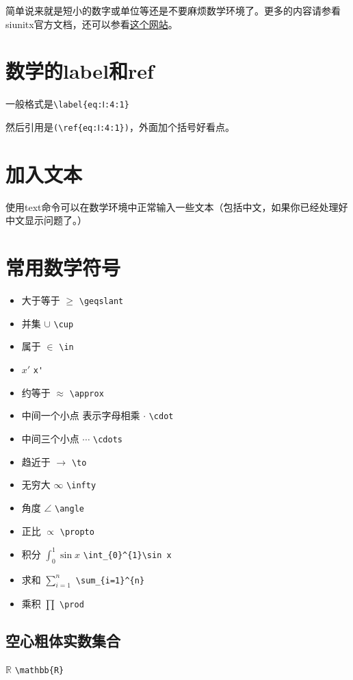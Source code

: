 \documentclass[11pt,oneside]{book}
\begin{document}
简单说来就是短小的数字或单位等还是不要麻烦数学环境了。更多的内容请参看siunitx官方文档，还可以参看\href{http://tex.stackexchange.com/questions/37168/when-to-use-math-mode}{这个网站}。



\section{数学的label和ref}
一般格式是\verb+\label{eq:Ⅰ:4:1}+

然后引用是\verb+(\ref{eq:Ⅰ:4:1})+，外面加个括号好看点。


\section{加入文本}
使用text命令可以在数学环境中正常输入一些文本（包括中文，如果你已经处理好中文显示问题了。）


\section{常用数学符号}
\begin{itemize}
\item  大于等于 $\geqslant$  \verb+\geqslant+
\item  并集 $\cup$  \verb+\cup+
\item 属于  $\in$  \verb+\in+
\item  $x'$  \verb+x'+
\item  约等于  $\approx$ \verb+\approx+
\item 中间一个小点 表示字母相乘 $\cdot$  \verb+\cdot+
\item 中间三个小点 $\cdots$  \verb+\cdots+
\item  趋近于  $\to$ \verb+\to+
\item 无穷大 $\infty$  \verb+\infty+
\item 角度 $\angle$ \verb+\angle+
\item  正比  $\propto$ \verb+\propto+
\item 积分 $\int_{0}^{1}\sin x$ \verb+\int_{0}^{1}\sin x+
\item 求和 $\sum_{i=1}^{n}$ \verb+\sum_{i=1}^{n}+
\item 乘积 $\prod$ \verb+\prod+
\end{itemize}


\subsection{空心粗体实数集合}
$\mathbb{R}$  \verb+\mathbb{R}+
\end{document}
